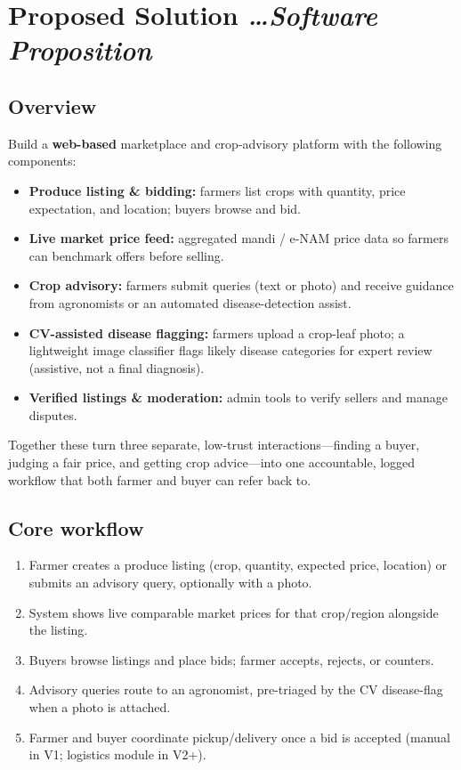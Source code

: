 \documentclass[11pt,a4paper]{article}
\newcommand{\BvrHint}[1]{%
  {\normalfont\normalsize\itshape\hfill #1}}
\begin{document}
\section{Proposed Solution %
  \BvrHint{\ldots Software Proposition}}
\subsection{Overview}
Build a \textbf{web-based} marketplace and crop-advisory platform with the following components:
\begin{itemize}[leftmargin=0.7cm]
    \item \textbf{Produce listing \& bidding:} farmers list crops with quantity, price expectation, and location; buyers browse and bid.
    \item \textbf{Live market price feed:} aggregated mandi / e-NAM price data so farmers can benchmark offers before selling.
    \item \textbf{Crop advisory:} farmers submit queries (text or photo) and receive guidance from agronomists or an automated disease-detection assist.
    \item \textbf{CV-assisted disease flagging:} farmers upload a crop-leaf photo; a lightweight image classifier flags likely disease categories for expert review (assistive, not a final diagnosis).
    \item \textbf{Verified listings \& moderation:} admin tools to verify sellers and manage disputes.
\end{itemize}
Together these turn three separate, low-trust interactions---finding a buyer, judging a fair price, and getting crop advice---into one accountable, logged workflow that both farmer and buyer can refer back to.

\subsection{Core workflow}
\begin{enumerate}[leftmargin=0.7cm]
    \item Farmer creates a produce listing (crop, quantity, expected price, location) or submits an advisory query, optionally with a photo.
    \item System shows live comparable market prices for that crop/region alongside the listing.
    \item Buyers browse listings and place bids; farmer accepts, rejects, or counters.
    \item Advisory queries route to an agronomist, pre-triaged by the CV disease-flag when a photo is attached.
    \item Farmer and buyer coordinate pickup/delivery once a bid is accepted (manual in V1; logistics module in V2+).
\end{enumerate}
\end{document}
